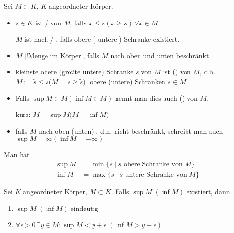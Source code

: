 \begin{*definition}
	Sei $M\subset K$, $K$ angeordneter Körper.
	\begin{itemize}
		\item $s\in K$ ist  /   von $M$, falls $x \le s (x \ge s)\,\forall x\in M$
		
		$M$ ist nach  /  , falls obere ( untere ) Schranke existiert.
		\item $M$ [!Menge im Körper], falls $M$ nach oben und unten beschränkt.
		\item kleinste obere (größte untere) Schranke $\tilde{s}$ von $M$ ist  () von $M$, d.h. \\
		$ M:= \tilde{s} \le s ($$ M = s \ge \tilde{s}) \;$ obere (untere) Schranken $s\in M$.
		\item Falls $\sup M \in M (\inf M\in M)$ nennt man dies auch  () von $M$.
		
		kurz: $M = \sup M ($$M = \inf M)$
		\item falls $M$ nach oben (unten) , d.h. nicht beschränkt, schreibt man auch $\sup M = \infty (\inf M = -\infty)$
	\end{itemize}

	Man hat
	\begin{align*}
	\sup M &= \min\{s \mid s \text{ obere Schranke von } M\}\\
	\inf M &= \max\{s \mid s \text{ untere Schranke von } M\}
	\end{align*}
\end{*definition}
\begin{proposition}
	Sei $K$ angeordneter Körper, $M\subset K$. Falls $\sup M\;(\inf M)$ existiert, dann
	\begin{enumerate}[label={\arabic*)}]
		\item $\sup M\;(\inf M)$ eindeutig
		\item $\forall \epsilon > 0\,\exists y\in M: \sup M < y + \epsilon\;(\inf M > y - \epsilon)$
	\end{enumerate}
\end{proposition}

